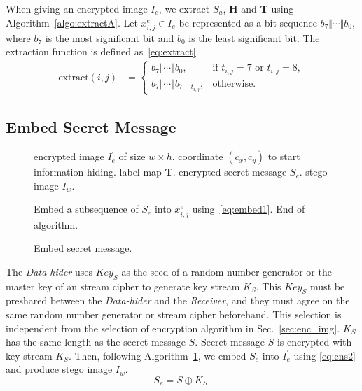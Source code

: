 \documentclass[journal]{IEEEtran}
\begin{document}
	When giving an encrypted image \(I_e\), we extract \(S_a\), \(\mathbf{H}\) and \(\mathbf{T}\) using Algorithm~\ref{algo:extractA}.
	Let \(x^e_{i, j} \in I_e\) be represented as a bit sequence \(b_7 \Vert \cdots \Vert b_0\), where \(b_7\) is the most significant bit and \(b_0\) is the least significant bit. 
	The extraction function is defined as~\eqref{eq:extract}.
%	
	\begin{align}
		\label{eq:extract}
		\mathrm{extract}(i, j)  &= 
		\begin{cases}
			b_7 \Vert \cdots \Vert b_0              ,& \text{if } t_{i, j} = 7 \text{ or } t_{i, j} = 8 , \\
			b_7 \Vert \cdots \Vert b_{7 - t_{i, j}} ,& \text{otherwise}.
		\end{cases}
	\end{align}
	
	
	
	
	
	\subsection{Embed Secret Message}
	
	\begin{figure}[!t]
		\begin{algorithm}[H]
			\caption{Embed secret message.}
			\label{algo:hider1}
			
			\begin{algorithmic}[1]
				\Require encrypted image \(I_e^\prime\) of size \(w \times h\).
				\Require coordinate \((c_x, c_y)\) to start information hiding.
				\Require label map \(\mathbf{T}\).
				\Require encrypted secret message \(S_e\).
				\Ensure stego image \(I_w\).
				
				\State			Embed a subsequence of \(S_e\) into \(x^e_{i, j}\) using~\eqref{eq:embed1}.
				\State			End of algorithm.
				\EndIf
				\EndFor
			\end{algorithmic}
		\end{algorithm}
	\end{figure}

	The \emph{Data-hider} uses \(Key_S\) as the seed of a random number generator or the master key of an stream cipher to generate key stream \(K_S\).
	This \(Key_S\) must be preshared between the \emph{Data-hider} and the \emph{Receiver}, and they must agree on the same random number generator or stream cipher beforehand.
	This selection is independent from the selection of encryption algorithm in Sec.~\ref{sec:enc_img}.
	\(K_S\) has the same length as the secret message \(S\).
	Secret message \(S\) is encrypted with key stream \(K_S\). 
	Then, following Algorithm~\ref{algo:hider1}, we embed \(S_e\) into \(I_e^\prime\) using \eqref{eq:ens2} and produce stego image \(I_w\).
%	
	\begin{equation}
		\label{eq:ens2}
		S_e = S \oplus K_S .
	\end{equation}
	
\end{document}
